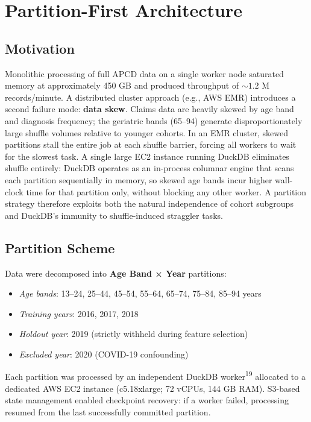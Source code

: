 \documentclass[
  12pt,
]{book}
\providecommand{\tightlist}{%
  \setlength{\itemsep}{0pt}\setlength{\parskip}{0pt}}
\begin{document}
\section{Partition-First Architecture}\label{sec-partition}

\subsection{Motivation}\label{motivation}

Monolithic processing of full APCD data on a single worker node
saturated memory at approximately 450 GB and produced throughput of
\({\sim}1.2\) M records/minute. A distributed cluster approach (e.g.,
AWS EMR) introduces a second failure mode: \textbf{data skew}. Claims
data are heavily skewed by age band and diagnosis frequency; the
geriatric bands (65--94) generate disproportionately large shuffle
volumes relative to younger cohorts. In an EMR cluster, skewed
partitions stall the entire job at each shuffle barrier, forcing all
workers to wait for the slowest task. A single large EC2 instance
running DuckDB eliminates shuffle entirely: DuckDB operates as an
in-process columnar engine that scans each partition sequentially in
memory, so skewed age bands incur higher wall-clock time for that
partition only, without blocking any other worker. A partition strategy
therefore exploits both the natural independence of cohort subgroups and
DuckDB's immunity to shuffle-induced straggler tasks.

\subsection{Partition Scheme}\label{partition-scheme}

Data were decomposed into \textbf{Age Band × Year} partitions:

\begin{itemize}
\tightlist
\item
  \emph{Age bands}: 13--24, 25--44, 45--54, 55--64, 65--74, 75--84,
  85--94 years
\item
  \emph{Training years}: 2016, 2017, 2018
\item
  \emph{Holdout year}: 2019 (strictly withheld during feature selection)
\item
  \emph{Excluded year}: 2020 (COVID-19 confounding)
\end{itemize}

Each partition was processed by an independent DuckDB
worker\textsuperscript{19} allocated to a dedicated AWS EC2 instance
(c5.18xlarge; 72 vCPUs, 144 GB RAM). S3-based state management enabled
checkpoint recovery: if a worker failed, processing resumed from the
last successfully committed partition.
\end{document}
